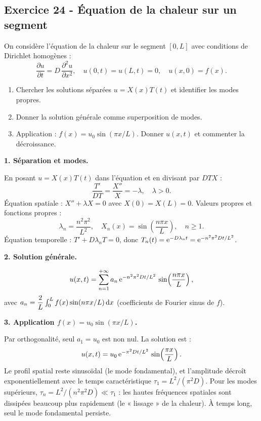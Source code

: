 \documentclass[12pt,a4paper]{article}
\begin{document}
\subsection*{Exercice 24 - Équation de la chaleur sur un segment \niveau{\difficile}}

\begin{boiteexercice}
On considère l'équation de la chaleur sur le segment $[0,L]$ avec conditions de Dirichlet homogènes :
\[
\frac{\partial u}{\partial t} = D\,\frac{\partial^2 u}{\partial x^2}, \quad u(0,t) = u(L,t) = 0, \quad u(x,0) = f(x).
\]
\begin{enumerate}
  \item Chercher les solutions séparées $u = X(x)T(t)$ et identifier les modes propres.
  \item Donner la solution générale comme superposition de modes.
  \item Application : $f(x) = u_0\sin(\pi x/L)$. Donner $u(x,t)$ et commenter la décroissance.
\end{enumerate}
\end{boiteexercice}

\begin{boitecorrige}

\textbf{1. Séparation et modes.}

En posant $u = X(x)T(t)$ dans l'équation et en divisant par $DTX$ :
\[
\frac{T'}{DT} = \frac{X''}{X} = -\lambda, \quad \lambda > 0.
\]
Équation spatiale : $X'' + \lambda X = 0$ avec $X(0) = X(L) = 0$. Valeurs propres et fonctions propres :
\[
\lambda_n = \frac{n^2\pi^2}{L^2}, \quad X_n(x) = \sin\!\left(\frac{n\pi x}{L}\right), \quad n\ge 1.
\]
Équation temporelle : $T' + D\lambda_n T = 0$, donc $T_n(t) = \mathrm{e}^{-D\lambda_n t} = \mathrm{e}^{-n^2\pi^2 D t/L^2}$.

\textbf{2. Solution générale.}

\[
u(x,t) = \sum_{n=1}^{+\infty} a_n\,\mathrm{e}^{-n^2\pi^2 D t/L^2}\,\sin\!\left(\frac{n\pi x}{L}\right),
\]
avec $a_n = \dfrac{2}{L}\int_0^L f(x)\sin(n\pi x/L)\,\mathrm{d} x$ (coefficients de Fourier sinus de $f$).

\textbf{3. Application $f(x) = u_0\sin(\pi x/L)$.}

Par orthogonalité, seul $a_1 = u_0$ est non nul. La solution est :
\[
u(x,t) = u_0\,\mathrm{e}^{-\pi^2 D t/L^2}\,\sin\!\left(\frac{\pi x}{L}\right).
\]
Le profil spatial reste sinusoïdal (le mode fondamental), et l'amplitude décroît exponentiellement avec le temps caractéristique $\tau_1 = L^2/(\pi^2 D)$. Pour les modes supérieurs, $\tau_n = L^2/(n^2\pi^2 D) \ll \tau_1$ : les hautes fréquences spatiales sont dissipées beaucoup plus rapidement (le « lissage » de la chaleur). À temps long, seul le mode fondamental persiste.

\end{boitecorrige}
\end{document}
